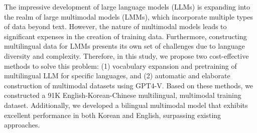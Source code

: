 The impressive development of large language models (LLMs) is expanding into the realm of large multimodal models (LMMs), which incorporate multiple types of data beyond text.  However, the nature of multimodal models leads to significant expenses in the creation of training data. Furthermore, constructing multilingual data for LMMs presents its own set of challenges due to language diversity and complexity. Therefore, in this study, we propose two cost-effective methods to solve this problem: (1) vocabulary expansion and pretraining of multilingual LLM for specific languages, and (2) automatic and elaborate construction of multimodal datasets using GPT4-V. Based on these methods, we constructed a 91K English-Korean-Chinese multilingual, multimodal training dataset. Additionally, we developed a bilingual multimodal model that exhibits excellent performance in both Korean and English, surpassing existing approaches.